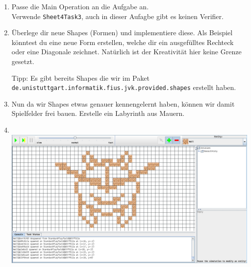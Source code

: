 
\begin{enumerate}
	\item
		Passe die Main Operation an die Aufgabe an.\\
		Verwende \lstinline{Sheet4Task3}, auch in dieser Aufagbe gibt es keinen Verifier.

	\item
		Überlege dir neue Shapes (Formen) und implementiere diese.
		Als Beispiel könntest du eine neue Form erstellen, welche dir ein ausgefülltes Rechteck oder eine Diagonale zeichnet.
		Natürlich ist der Kreativität hier keine Grenze gesetzt.

		Tipp: Es gibt bereits Shapes die wir im Paket \lstinline{de.unistuttgart.informatik.fius.jvk.provided.shapes} erstellt haben.

	\item
		Nun da wir Shapes etwas genauer kennengelernt haben, können wir damit Spielfelder frei bauen.
		Erstelle ein Labyrinth aus Mauern.

	\item
		\\
		\includegraphics[width=\linewidth]{./figures/playfield.png}

\end{enumerate}

\newpage
